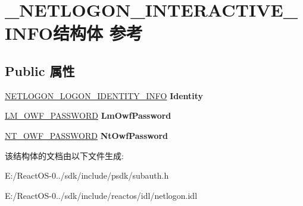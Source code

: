 \hypertarget{struct___n_e_t_l_o_g_o_n___i_n_t_e_r_a_c_t_i_v_e___i_n_f_o}{}\section{\+\_\+\+N\+E\+T\+L\+O\+G\+O\+N\+\_\+\+I\+N\+T\+E\+R\+A\+C\+T\+I\+V\+E\+\_\+\+I\+N\+F\+O结构体 参考}
\label{struct___n_e_t_l_o_g_o_n___i_n_t_e_r_a_c_t_i_v_e___i_n_f_o}
\subsection*{Public 属性}
\begin{DoxyCompactItemize}
\item 
\mbox{\label{struct___n_e_t_l_o_g_o_n___i_n_t_e_r_a_c_t_i_v_e___i_n_f_o_a49c15f2026dea45f7f11d55a3c1ec721}} 
\hyperlink{struct___n_e_t_l_o_g_o_n___l_o_g_o_n___i_d_e_n_t_i_t_y___i_n_f_o}{N\+E\+T\+L\+O\+G\+O\+N\+\_\+\+L\+O\+G\+O\+N\+\_\+\+I\+D\+E\+N\+T\+I\+T\+Y\+\_\+\+I\+N\+FO} {\bfseries Identity}
\item 
\mbox{\label{struct___n_e_t_l_o_g_o_n___i_n_t_e_r_a_c_t_i_v_e___i_n_f_o_a55b9255605f4535feaa540491ed6bd6e}} 
\hyperlink{struct___l_m___o_w_f___p_a_s_s_w_o_r_d}{L\+M\+\_\+\+O\+W\+F\+\_\+\+P\+A\+S\+S\+W\+O\+RD} {\bfseries Lm\+Owf\+Password}
\item 
\mbox{\label{struct___n_e_t_l_o_g_o_n___i_n_t_e_r_a_c_t_i_v_e___i_n_f_o_a397bb7bab362730ac9895c517e592fe8}} 
\hyperlink{struct___l_m___o_w_f___p_a_s_s_w_o_r_d}{N\+T\+\_\+\+O\+W\+F\+\_\+\+P\+A\+S\+S\+W\+O\+RD} {\bfseries Nt\+Owf\+Password}
\end{DoxyCompactItemize}


该结构体的文档由以下文件生成\+:\begin{DoxyCompactItemize}
\item 
E\+:/\+React\+O\+S-\/0../sdk/include/psdk/subauth.\+h\item 
E\+:/\+React\+O\+S-\/0../sdk/include/reactos/idl/netlogon.\+idl\end{DoxyCompactItemize}
